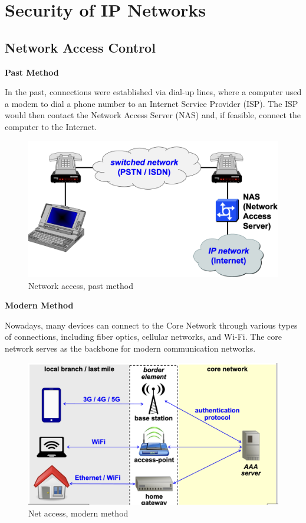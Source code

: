 \chapter{Security of IP Networks}
\cite{04_NetSec}

\section{Network Access Control}

\begin{multicols}{2}
    \raggedright
    \begin{center}
        \textbf{Past Method}
    \end{center}
    In the past, connections were established via dial-up lines, where a computer used a modem to dial a phone number to an Internet Service Provider (ISP). The ISP would then contact the Network Access Server (NAS) and, if feasible, connect the computer to the Internet.
    \begin{figure}[H]
        \includegraphics[width=\linewidth]{Images/NetSec/NetAccessOld.png}
        \caption{Network access, past method}
    \end{figure}
    \columnbreak
    \begin{center}
        \textbf{Modern Method}
    \end{center}
    Nowadays, many devices can connect to the Core Network through various types of connections, including fiber optics, cellular networks, and Wi-Fi. The core network serves as the backbone for modern communication networks.
    \begin{figure}[H]
        \includegraphics[width=\linewidth]{Images/NetSec/NetAccesModern.png}
        \caption{Net access, modern method}
    \end{figure}
\end{multicols}

